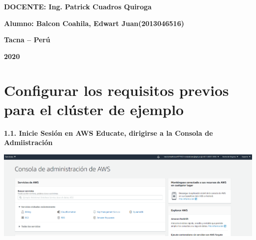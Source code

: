 \documentclass{article}
\begin{document}
\begin{titlepage}
\begin{center}
\vspace*{0.3in}
\begin{Large}
\textbf{DOCENTE: Ing. Patrick Cuadros Quiroga} \\
\end{Large}

\vspace*{0.2in}
\vspace*{0.1in}
\begin{large}

\begin{Large}
\textbf{Alumno: Balcon Coahila, Edwart Juan\hfill	(2013046516) } \\
\end{Large}

\vspace*{0.15in}
\begin{Large}
\textbf{Tacna – Perú} \\
\end{Large}

\vspace*{0.05in}
\begin{Large}
\textbf{2020 } \\
\end{Large}

\end{large}
\end{center}

\end{titlepage}


\newpage

\section{ Configurar los requisitos previos para el clúster de ejemplo}

\textbf{1.1. Inicie Sesión en AWS Educate, dirigirse a la Consola de Admiistración}

    \begin{center}
		\includegraphics[width=15cm]{./images/1} 
	\end{center}
	
\end{document}
